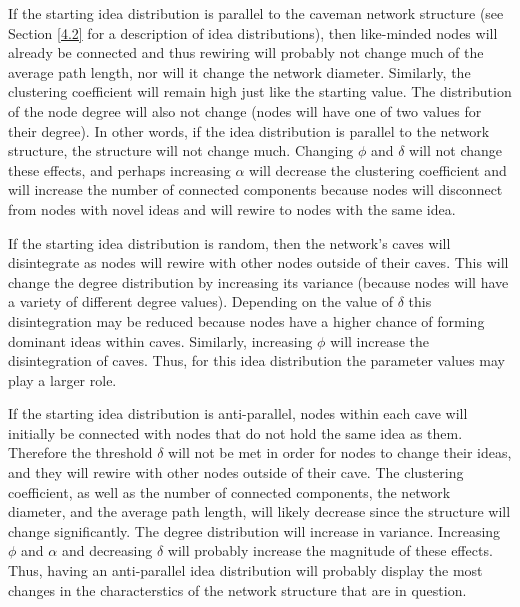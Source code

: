 If the starting idea distribution is parallel to the caveman network structure (see Section \ref{4.2} for a description of idea distributions), then like-minded nodes will already be connected and thus rewiring will probably not change much of the average path length, nor will it change the network diameter. Similarly, the clustering coefficient will remain high just like the starting value. The distribution of the node degree will also not change (nodes will have one of two values for their degree). In other words, if the idea distribution is parallel to the network structure, the structure will not change much. Changing $\phi$ and $\delta$ will not change these effects, and perhaps increasing $\alpha$ will decrease the clustering coefficient and will increase the number of connected components because nodes will disconnect from nodes with novel ideas and will rewire to nodes with the same idea.

If the starting idea distribution is random, then the network's caves will disintegrate as nodes will rewire with other nodes outside of their caves. This will change the degree distribution by increasing its variance (because nodes will have a variety of different degree values). Depending on the value of $\delta$ this disintegration may be reduced because nodes have a higher chance of forming dominant ideas within caves. Similarly, increasing $\phi$ will increase the disintegration of caves. Thus, for this idea distribution the parameter values may play a larger role.

If the starting idea distribution is anti-parallel, nodes within each cave will initially be connected with nodes that do not hold the same idea as them. Therefore the threshold $\delta$ will not be met in order for nodes to change their ideas, and they will rewire with other nodes outside of their cave. The clustering coefficient, as well as the number of connected components, the network diameter, and the average path length, will likely decrease since the structure will change significantly. The degree distribution will increase in variance. Increasing $\phi$ and $\alpha$ and decreasing $\delta$ will probably increase the magnitude of these effects. Thus, having an anti-parallel idea distribution will probably display the most changes in the characterstics of the network structure that are in question.



